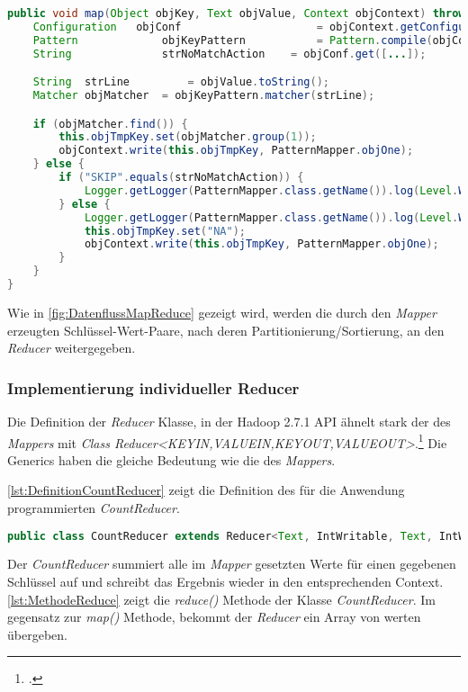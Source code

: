 \begin{lstlisting}[language=Java,caption=Methode \textit{map()} der Klasse \textit{PatternMapper},label=lst:MethodeMap]
public void map(Object objKey, Text objValue, Context objContext) throws IOException, InterruptedException {
	Configuration	objConf						= objContext.getConfiguration();
	Pattern				objKeyPattern			= Pattern.compile(objConf.get([...]));
	String				strNoMatchAction	= objConf.get([...]);

	String 	strLine 		= objValue.toString();
	Matcher	objMatcher	= objKeyPattern.matcher(strLine);

	if (objMatcher.find()) {
		this.objTmpKey.set(objMatcher.group(1));
		objContext.write(this.objTmpKey, PatternMapper.objOne);
	} else {
		if ("SKIP".equals(strNoMatchAction)) {
			Logger.getLogger(PatternMapper.class.getName()).log(Level.WARNING, [...]);
		} else {
			Logger.getLogger(PatternMapper.class.getName()).log(Level.WARNING, [...]);
			this.objTmpKey.set("NA");
			objContext.write(this.objTmpKey, PatternMapper.objOne);
		}
	}
}
\end{lstlisting}

Wie in \autoref{fig:DatenflussMapReduce} gezeigt wird, werden die durch den \textit{Mapper} erzeugten Schlüssel-Wert-Paare, nach deren Partitionierung/Sortierung, an den \textit{Reducer} weitergegeben.

\subsubsection{Implementierung individueller Reducer}
Die Definition der \textit{Reducer} Klasse, in der Hadoop 2.7.1 \ac{API} ähnelt stark der des \textit{Mappers} mit \textit{Class Reducer<KEYIN,VALUEIN,KEYOUT,VALUEOUT>}.\footcite[Vgl.][]{ApacheHadoopApiDokuReducer.2015} Die Generics haben die gleiche Bedeutung wie die des \textit{Mappers}.

\autoref{lst:DefinitionCountReducer} zeigt die Definition des für die Anwendung programmierten \textit{CountReducer}.  \\

\begin{lstlisting}[language=Java,caption=Deklaration \textit{CountReducer} mit Generics,label=lst:DefinitionCountReducer]
public class CountReducer extends Reducer<Text, IntWritable, Text, IntWritable>
\end{lstlisting}

Der \textit{CountReducer} summiert alle im \textit{Mapper} gesetzten Werte für einen gegebenen Schlüssel auf und schreibt das Ergebnis wieder in den entsprechenden Context. \autoref{lst:MethodeReduce} zeigt die \textit{reduce()} Methode der Klasse \textit{CountReducer}. Im gegensatz zur \textit{map()} Methode, bekommt der \textit{Reducer} ein Array von werten übergeben. \\

